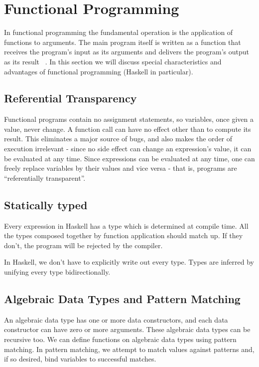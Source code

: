 \chapter{Functional Programming}
\label{chap:funcprog}

In functional programming the fundamental operation is the application of
functions to arguments. The main program itself is written as a function that
receives the program's input as its arguments and delivers the program's output as its result ~\cite{hughes1989functional}.
In this section we will discuss special characteristics and advantages of functional programming (Haskell in particular).

\section{Referential Transparency}
Functional programs contain no assignment statements, so variables, once given a value, never change. A function call can have no effect other than to compute its result. This eliminates a major source of bugs, and also makes the order of execution irrelevant - since no side effect can change an expression's value, it can be evaluated at any time. Since expressions can be evaluated at any time, one can freely replace variables by their values and vice versa - that is, programs are ``referentially transparent''.

\section{Statically typed}
Every expression in Haskell has a type which is determined at compile time. All the types composed together by function application should match up. If they don't, the program will be rejected by the compiler.

In Haskell, we don't have to explicitly write out every type. Types are inferred by unifying every type bidirectionally.

\section{Algebraic Data Types and Pattern Matching}
An algebraic data type has one or more data constructors, and each data constructor can have zero or more arguments. These algebraic data types can be recursive too.
We can define functions on algebraic data types using pattern matching. In pattern matching, we attempt to match values against patterns and, if so desired, bind variables to successful matches.


